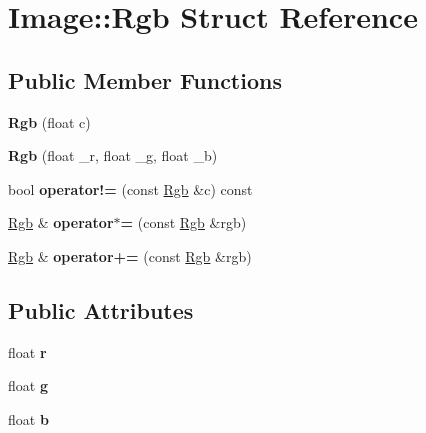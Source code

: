 \hypertarget{structImage_1_1Rgb}{}\section{Image\+:\+:Rgb Struct Reference}
\label{structImage_1_1Rgb}
\subsection*{Public Member Functions}
\begin{DoxyCompactItemize}
\item 
{\bfseries Rgb} (float c)\hypertarget{structImage_1_1Rgb_a764740af5f1baa9556e9cad743ed58c0}{}\label{structImage_1_1Rgb_a764740af5f1baa9556e9cad743ed58c0}

\item 
{\bfseries Rgb} (float \+\_\+r, float \+\_\+g, float \+\_\+b)\hypertarget{structImage_1_1Rgb_a7b838e62eff23abb7ebc0ca5f2fee613}{}\label{structImage_1_1Rgb_a7b838e62eff23abb7ebc0ca5f2fee613}

\item 
bool {\bfseries operator!=} (const \hyperlink{structImage_1_1Rgb}{Rgb} \&c) const \hypertarget{structImage_1_1Rgb_ad74f649821a69910da1f519361148be1}{}\label{structImage_1_1Rgb_ad74f649821a69910da1f519361148be1}

\item 
\hyperlink{structImage_1_1Rgb}{Rgb} \& {\bfseries operator$\ast$=} (const \hyperlink{structImage_1_1Rgb}{Rgb} \&rgb)\hypertarget{structImage_1_1Rgb_adf61483256e42d1ea51323a04eed0d79}{}\label{structImage_1_1Rgb_adf61483256e42d1ea51323a04eed0d79}

\item 
\hyperlink{structImage_1_1Rgb}{Rgb} \& {\bfseries operator+=} (const \hyperlink{structImage_1_1Rgb}{Rgb} \&rgb)\hypertarget{structImage_1_1Rgb_aef49ca6e270b9796f2636ec88f30b21f}{}\label{structImage_1_1Rgb_aef49ca6e270b9796f2636ec88f30b21f}

\end{DoxyCompactItemize}
\subsection*{Public Attributes}
\begin{DoxyCompactItemize}
\item 
float {\bfseries r}\hypertarget{structImage_1_1Rgb_ab5f41861e08d042f185709864495fb37}{}\label{structImage_1_1Rgb_ab5f41861e08d042f185709864495fb37}

\item 
float {\bfseries g}\hypertarget{structImage_1_1Rgb_a9da51d620ca519b946c39851ea36405c}{}\label{structImage_1_1Rgb_a9da51d620ca519b946c39851ea36405c}

\item 
float {\bfseries b}\hypertarget{structImage_1_1Rgb_aacef9102d860e268d8b2643233ffe31e}{}\label{structImage_1_1Rgb_aacef9102d860e268d8b2643233ffe31e}

\end{DoxyCompactItemize}

